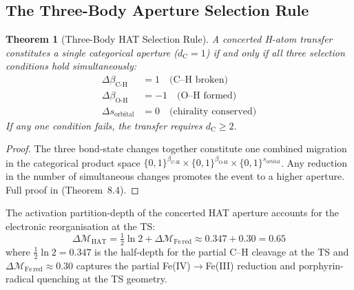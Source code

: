 \documentclass[11pt,twocolumn,a4paper]{article}
\newtheorem{theorem}{Theorem}[section]
\theoremstyle{definition}
\theoremstyle{remark}
\newcommand{\depth}{\mathcal{M}}
\newcommand{\dC}{d_{\mathrm{C}}}
\newcommand{\betaCH}{\beta_{\mathrm{C\text{-}H}}}
\newcommand{\betaOH}{\beta_{\mathrm{O\text{-}H}}}
\begin{document}
\subsection{The Three-Body Aperture Selection Rule}

\begin{theorem}[Three-Body HAT Selection Rule]
\label{thm:three_body_selection}
A concerted H-atom transfer constitutes a single categorical aperture
($\dC = 1$) if and only if all three selection conditions hold
simultaneously:
\begin{align}
\Delta\betaCH &= 1 \quad \text{(C--H broken)} \\
\Delta\betaOH &= -1 \quad \text{(O--H formed)} \\
\Delta s_{\mathrm{orbital}} &= 0 \quad \text{(chirality conserved)}
\end{align}
If any one condition fails, the transfer requires $\dC \geq 2$.
\end{theorem}

\begin{proof}
The three bond-state changes together constitute one combined migration
in the categorical product space $\{0,1\}^{\betaCH} \times
\{0,1\}^{\betaOH} \times \{0,1\}^{s_{\mathrm{orbital}}}$. Any reduction in
the number of simultaneous changes promotes the event to a higher aperture.
Full proof in \citep{sachikonye2025_isomorphism} (Theorem~8.4).
\end{proof}

The activation partition-depth of the concerted HAT aperture accounts for
the electronic reorganisation at the TS:
\begin{equation}
\Delta\depth_{\mathrm{HAT}} = \tfrac{1}{2}\ln 2 + \Delta\depth_{\mathrm{Fe\,red}}
\approx 0.347 + 0.30 = 0.65
\label{eq:deltaM_HAT}
\end{equation}
where $\tfrac{1}{2}\ln 2 = 0.347$ is the half-depth for the partial C--H
cleavage at the TS and $\Delta\depth_{\mathrm{Fe\,red}} \approx 0.30$ captures
the partial Fe(IV)$\to$Fe(III) reduction and porphyrin-radical quenching at
the TS geometry.
\end{document}
